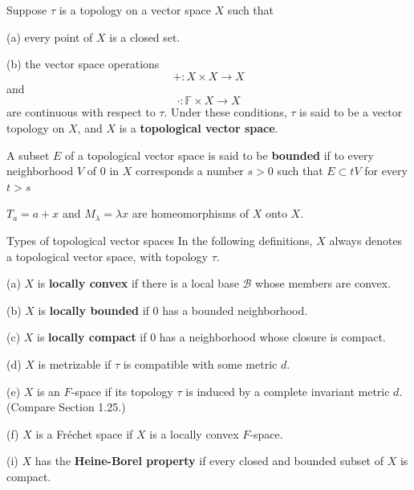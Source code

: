 \documentclass[12pt, oneside]{book}
\begin{document}
\begin{definition}
    Suppose $\tau$ is a topology on a vector space $X$ such that

    (a) every point of $X$ is a closed set.

    (b) the vector space operations
    \begin{equation*}
        +: X\times X \rightarrow X
    \end{equation*}
    and
    \begin{equation*}
        \cdot : \mathbb{F}\times X \rightarrow X
    \end{equation*}
    are continuous with respect to $\tau$.
    Under these conditions, $\tau$ is said to be a vector topology on $X$, and $X$ is a \textbf{topological vector space}.

    A subset $E$ of a topological vector space is said to be \textbf{bounded} if to every neighborhood $V$ of 0 in $X$ corresponds a number $s>0$ such that $E \subset t V$ for every $t>s$
\end{definition}

\begin{proposition}
    $T_a = a+x$ and $M_\lambda =\lambda x$ are homeomorphisms of $X$ onto $X$.
\end{proposition}


\begin{definition}
    Types of topological vector spaces In the following definitions, $X$ always denotes a topological vector space, with topology $\tau$.

    (a) $X$ is \textbf{locally convex} if there is a local base $\mathscr{B}$ whose members are convex.

    (b) $X$ is \textbf{locally bounded} if $0$ has a bounded neighborhood.

    (c) $X$ is \textbf{locally compact} if $0$ has a neighborhood whose closure is compact.

    (d) $X$ is metrizable if $\tau$ is compatible with some metric $d$.

    (e) $X$ is an $F$-space if its topology $\tau$ is induced by a complete invariant metric $d$. (Compare Section 1.25.)

    (f) $X$ is a Fréchet space if $X$ is a locally convex $F$-space.

    (i) $X$ has the \textbf{Heine-Borel property} if every closed and bounded subset of $X$ is compact.

\end{definition}
\end{document}
